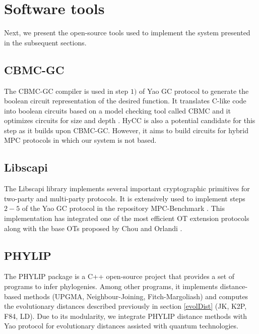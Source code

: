 \section{Software tools} \label{softTools}


Next, we present the open-source tools used to implement the system presented in the subsequent sections.

\subsection{CBMC-GC}

The CBMC-GC compiler \cite{F14} is used in step $1)$ of Yao GC protocol to generate the boolean circuit representation of the desired function. It translates C-like code into boolean circuits based on a model checking tool called CBMC and it optimizes circuits for size and depth \cite{Bscher2017, Buescher2016}. HyCC \cite{Bscher2018} is also a potential candidate for this step as it builds upon CBMC-GC. However, it aims to build circuits for hybrid MPC protocols in which our system is not based.

\subsection{Libscapi}

The Libscapi library \cite{Libscapi} implements several important cryptographic primitives for two-party and multi-party protocols. It is extensively used to implement steps $2-5$ of the Yao GC protocol in the repository MPC-Benchmark \cite{mpc_benchmark}. This implementation has integrated one of the most efficient OT extension protocols \cite{K15} along with the base OTs proposed by Chou and Orlandi \cite{C15}.

\subsection{PHYLIP}

The PHYLIP package \cite{F89} is a C++ open-source project that provides a set of programs to infer phylogenies. Among other programs, it implements distance-based methods (UPGMA, Neighbour-Joining, Fitch-Margoliash) and computes the evolutionary distances described previously in section \ref{evolDist} (JK, K2P, F84, LD). Due to its modularity, we integrate PHYLIP distance methods with Yao protocol for evolutionary distances assisted with quantum technologies.




